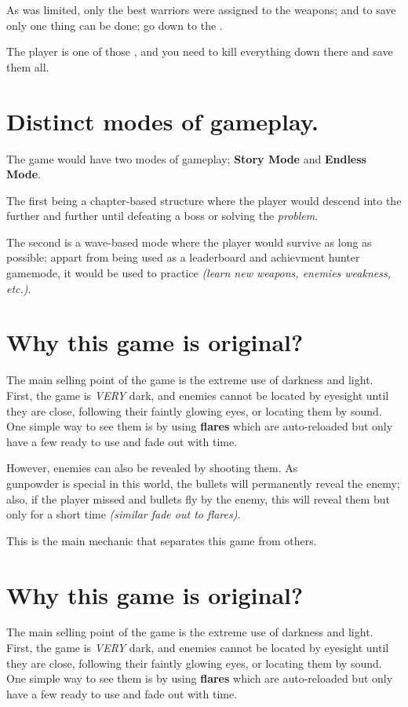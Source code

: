 As \gunpowder was limited, only the best warriors were assigned to the \gunpowder weapons; and to save \humanity only one thing can be done; go down to the \hole.

The player is one of those \hunters, and you need to kill everything down there and save them all.

\newpage



\section{Distinct modes of gameplay.}
The game would have two modes of gameplay; \textbf{Story Mode} and \textbf{Endless Mode}.

The first being a chapter-based structure where the player would descend into the \hole further and further until defeating a boss or solving the \hole \textit{problem}.

The second is a wave-based mode where the player would survive as long as possible; appart from being used as a leaderboard and achievment hunter gamemode, it would be used to practice \textit{(learn new weapons, enemies weakness, etc.)}.


\section{Why this game is original?}
The main selling point of the game is the extreme use of darkness and light. First, the game is \textit{VERY} dark, and enemies cannot be located by eyesight until they are close, following their faintly glowing eyes, or locating them by sound. One simple way to see them is by using \textbf{flares} which are auto-reloaded but only have a few ready to use and fade out with time.

However, enemies can also be revealed by shooting them. As \\gunpowder is special in this world, the bullets will permanently reveal the enemy; also, if the player missed and bullets fly by the enemy, this will reveal them but only for a short time \textit{(similar fade out to flares)}.

This is the main mechanic that separates this game from others.


\section{Why this game is original?}
The main selling point of the game is the extreme use of darkness and light. First, the game is \textit{VERY} dark, and enemies cannot be located by eyesight until they are close, following their faintly glowing eyes, or locating them by sound. One simple way to see them is by using \textbf{flares} which are auto-reloaded but only have a few ready to use and fade out with time.

